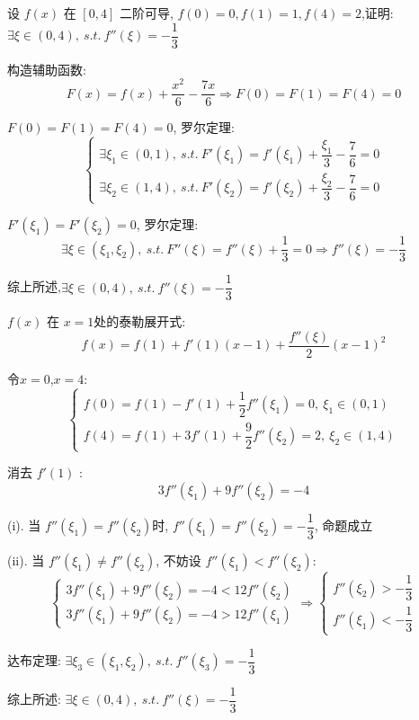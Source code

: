 \begin{proposition}
	设 $f(x)$ 在 $[0,4]$ 二阶可导, $f(0)=0,f(1)=1,f(4)=2$,证明: $\exists \xi\in(0,4),\ s.t.\ f''(\xi)=-\dfrac{1}{3}$
\end{proposition}
\begin{solution}

	构造辅助函数: 
	$$F(x)=f(x)+\dfrac{x^2}{6}-\dfrac{7x}{6}\Rightarrow F(0)=F(1)=F(4)=0$$

	$F(0)=F(1)=F(4)=0$, 罗尔定理:
	$$\begin{cases}
		\exists \xi_{1}\in(0,1),\ s.t.\ F'(\xi_{1})=f'(\xi_{1})+\dfrac{\xi_{1}}{3}-\dfrac{7}{6}=0 \\
		\exists \xi_{2}\in(1,4),\ s.t.\ F'(\xi_{2})=f'(\xi_{2})+\dfrac{\xi_{2}}{3}-\dfrac{7}{6}=0
	\end{cases}$$

	$F'(\xi_{1}) = F'(\xi_{2}) = 0$, 罗尔定理:
	$$\exists \xi\in(\xi_{1},\xi_{2}),\ s.t.\ F''(\xi)=f''(\xi)+\dfrac{1}{3}=0\Rightarrow f''(\xi)=-\dfrac{1}{3}$$

	综上所述,$\exists \xi\in(0,4),\ s.t.\ f''(\xi)=-\dfrac{1}{3}$
\end{solution}
\begin{anymark}[泰勒展开]
	$f(x)$ 在 $x=1$处的泰勒展开式:
	$$f(x)=f(1)+f'(1)(x-1)+\dfrac{f''(\xi)}{2}(x-1)^2$$

	令$x=0$,$x=4$:
	$$\begin{cases}
		f(0)=f(1)-f'(1)+\dfrac{1}{2}f''(\xi_{1})=0,\ \xi_{1}\in(0,1) \\
		f(4)=f(1)+3f'(1)+\dfrac{9}{2}f''(\xi_{2})=2,\ \xi_{2}\in(1,4)
	\end{cases}$$

	消去 $f'(1)$ :
	$$3f''(\xi_{1})+9f''(\xi_{2})=-4$$

	(i). 当 $f''(\xi_{1})=f''(\xi_{2})$时, $f''(\xi_{1})=f''(\xi_{2})=-\dfrac{1}{3}$, 命题成立

	(ii). 当 $f''(\xi_{1})\neq f''(\xi_{2})$, 不妨设 $f''(\xi_{1})<f''(\xi_{2})$:
	$$\begin{cases}
		3f''(\xi_{1}) + 9f''(\xi_{2}) = -4 < 12f''(\xi_{2})\\
		3f''(\xi_{1}) + 9f''(\xi_{2}) = -4 > 12f''(\xi_{1})
	\end{cases}\Rightarrow
	\begin{cases}
		f''(\xi_{2}) > -\dfrac{1}{3}\\
		f''(\xi_{1}) < -\dfrac{1}{3}
	\end{cases}$$

	达布定理: $\exists \xi_{3}\in(\xi_{1},\xi_{2}),\ s.t.\ f''(\xi_{3})=-\dfrac{1}{3}$

	综上所述: $\exists\xi\in(0,4),\ s.t.\ f''(\xi)=-\dfrac{1}{3}$
\end{anymark}

